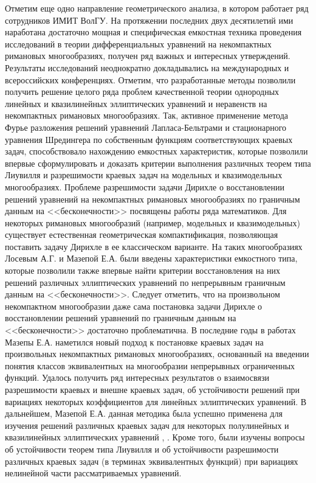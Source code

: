 \documentclass[a4paper,11pt,twoside]{article}
\begin{document}
Отметим еще одно направление геометрического анализа, в котором работает ряд сотрудников ИМИТ ВолГУ.  На протяжении последних двух десятилетий ими наработана достаточно мощная и специфическая емкостная техника проведения исследований в теории дифференциальных уравнений на некомпактных римановых многообразиях, получен  ряд важных и интересных утверждений. Результаты исследований неоднократно докладывались на международных и всероссийских конференциях. Отметим, что разработанные методы позволили получить решение целого ряда проблем качественной теории однородных линейных и квазилинейных эллиптических уравнений и неравенств на некомпактных римановых многообразиях. Так, активное применение  метода Фурье разложения решений уравнений Лапласа-Бельтрами и стационарного уравнения Шредингера  по собственным функциям соответствующих краевых задач, способствовало нахождению емкостных характеристик, которые позволили впервые сформулировать и доказать критерии выполнения различных теорем типа Лиувилля и разрешимости краевых задач на модельных и квазимодельных многообразиях.  
	Проблеме разрешимости задачи Дирихле о восстановлении решений уравнений на некомпактных римановых многообразиях по граничным данным на <<бесконечности>> посвящены работы ряда математиков.  Для некоторых римановых многообразий (например, модельных  и  квазимодельных) существует естественная геометрическая компактификация, позволяющая поставить задачу Дирихле в ее классическом варианте. На таких многообразиях Лосевым А.Г. и Мазепой Е.А. были введены характеристики емкостного типа, которые позволили  также впервые найти критерии восстановления на них решений различных эллиптических уравнений по непрерывным граничным данным на <<бесконечности>>.
	Следует отметить, что  на произвольном некомпактном многообразии даже сама постановка  задачи Дирихле о восстановлении решений уравнений по граничным данным на <<бесконечности>>  достаточно проблематична. В последние годы в работах Мазепы Е.А. наметился новый подход к постановке краевых задач на произвольных некомпактных римановых многообразиях, основанный на введении понятия классов эквивалентных на многообразии непрерывных ограниченных функций. Удалось получить ряд интересных результатов о взаимосвязи разрешимости краевых и внешне краевых задач, об устойчивости решений при вариациях некоторых коэффициентов для линейных эллиптических уравнений. В дальнейшем, Мазепой Е.А.  данная методика была успешно применена для изучения решений различных краевых задач для некоторых полулинейных  и квазилинейных эллиптических уравнений \cite{27}, \cite{28}. Кроме того, были изучены вопросы об устойчивости теорем типа Лиувилля и об устойчивости разрешимости различных краевых задач (в терминах эквивалентных функций) при вариациях нелинейной части рассматриваемых уравнений.
\end{document}
